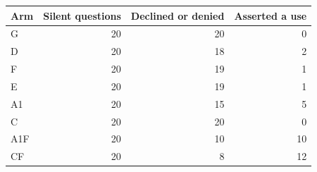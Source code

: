 \begin{tabular}{lrrr}
\toprule
Arm & Silent questions & Declined or denied & Asserted a use \\
\midrule
G & 20 & 20 & 0 \\
D & 20 & 18 & 2 \\
F & 20 & 19 & 1 \\
E & 20 & 19 & 1 \\
A1 & 20 & 15 & 5 \\
C & 20 & 20 & 0 \\
A1F & 20 & 10 & 10 \\
CF & 20 & 8 & 12 \\
\bottomrule
\end{tabular}
